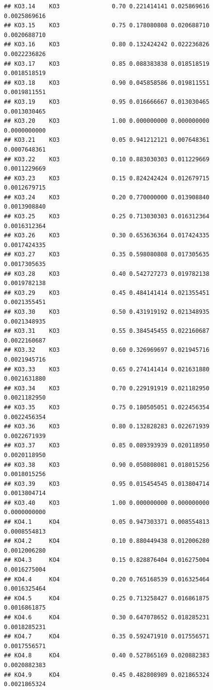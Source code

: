 \documentclass[
]{book}
\begin{document}
\begin{verbatim}
## KO3.14    KO3               0.70 0.221414141 0.025869616 0.0025869616
## KO3.15    KO3               0.75 0.178080808 0.020688710 0.0020688710
## KO3.16    KO3               0.80 0.132424242 0.022236826 0.0022236826
## KO3.17    KO3               0.85 0.088383838 0.018518519 0.0018518519
## KO3.18    KO3               0.90 0.045858586 0.019811551 0.0019811551
## KO3.19    KO3               0.95 0.016666667 0.013030465 0.0013030465
## KO3.20    KO3               1.00 0.000000000 0.000000000 0.0000000000
## KO3.21    KO3               0.05 0.941212121 0.007648361 0.0007648361
## KO3.22    KO3               0.10 0.883030303 0.011229669 0.0011229669
## KO3.23    KO3               0.15 0.824242424 0.012679715 0.0012679715
## KO3.24    KO3               0.20 0.770000000 0.013908840 0.0013908840
## KO3.25    KO3               0.25 0.713030303 0.016312364 0.0016312364
## KO3.26    KO3               0.30 0.653636364 0.017424335 0.0017424335
## KO3.27    KO3               0.35 0.598080808 0.017305635 0.0017305635
## KO3.28    KO3               0.40 0.542727273 0.019782138 0.0019782138
## KO3.29    KO3               0.45 0.484141414 0.021355451 0.0021355451
## KO3.30    KO3               0.50 0.431919192 0.021348935 0.0021348935
## KO3.31    KO3               0.55 0.384545455 0.022160687 0.0022160687
## KO3.32    KO3               0.60 0.326969697 0.021945716 0.0021945716
## KO3.33    KO3               0.65 0.274141414 0.021631880 0.0021631880
## KO3.34    KO3               0.70 0.229191919 0.021182950 0.0021182950
## KO3.35    KO3               0.75 0.180505051 0.022456354 0.0022456354
## KO3.36    KO3               0.80 0.132828283 0.022671939 0.0022671939
## KO3.37    KO3               0.85 0.089393939 0.020118950 0.0020118950
## KO3.38    KO3               0.90 0.050808081 0.018015256 0.0018015256
## KO3.39    KO3               0.95 0.015454545 0.013804714 0.0013804714
## KO3.40    KO3               1.00 0.000000000 0.000000000 0.0000000000
## KO4.1     KO4               0.05 0.947303371 0.008554813 0.0008554813
## KO4.2     KO4               0.10 0.880449438 0.012006280 0.0012006280
## KO4.3     KO4               0.15 0.828876404 0.016275004 0.0016275004
## KO4.4     KO4               0.20 0.765168539 0.016325464 0.0016325464
## KO4.5     KO4               0.25 0.713258427 0.016861875 0.0016861875
## KO4.6     KO4               0.30 0.647078652 0.018285231 0.0018285231
## KO4.7     KO4               0.35 0.592471910 0.017556571 0.0017556571
## KO4.8     KO4               0.40 0.527865169 0.020882383 0.0020882383
## KO4.9     KO4               0.45 0.482808989 0.021865324 0.0021865324

\end{verbatim}
\end{document}
